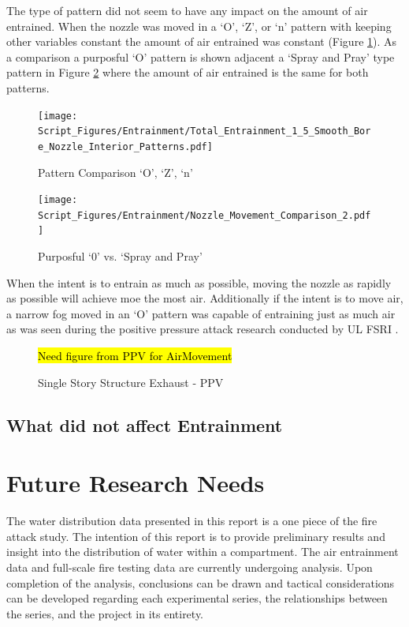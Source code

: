 \documentclass[12pt,oneside]{book}
\begin{document}
The type of pattern did not seem to have any impact on the amount of air entrained. When the nozzle was moved in a `O', `Z', or `n' pattern with keeping other variables constant the amount of air entrained was constant (Figure \ref{fig:Pattern_Compare_1}). As a comparison a purposful `O' pattern is shown adjacent a `Spray and Pray' type pattern in Figure \ref{fig:Pattern_Compare_2} where the amount of air entrained is the same for both patterns. 

\begin{figure}[!ht]
\centering
\texttt{[image: Script\_Figures/Entrainment/Total\_Entrainment\_1\_5\_Smooth\_Bore\_Nozzle\_Interior\_Patterns.pdf]}
\caption{Pattern Comparison `O', `Z', `n'}
\label{fig:Pattern_Compare_1}
\end{figure}

\begin{figure}[!ht]
\centering
\texttt{[image: Script\_Figures/Entrainment/Nozzle\_Movement\_Comparison\_2.pdf]}
\caption{Purposful `0' vs. `Spray and Pray'}
\label{fig:Pattern_Compare_2}
\end{figure}

When the intent is to entrain as much as possible, moving the nozzle as rapidly as possible will achieve moe the most air. Additionally if the intent is to move air, a narrow fog moved in an `O' pattern was capable of entraining just as much air as was seen during the positive pressure attack research conducted by UL FSRI \cite{Zevotek_Kerber:2016}. 

\begin{figure}
\centering
\hl{Need figure from PPV for AirMovement}
\caption{Single Story Structure Exhaust - PPV \cite{Zevotek_Kerber:2016}}
\label{fig:PPV}
\end{figure}


\section{What did not affect Entrainment}



\clearpage

\chapter{Future Research Needs}

The water distribution data presented in this report is a one piece of the fire attack study. The intention of this report is to provide preliminary results and insight into the distribution of water within a compartment. The air entrainment data and full-scale fire testing data are currently undergoing analysis. Upon completion of the analysis, conclusions can be drawn and tactical considerations can be developed regarding each experimental series, the relationships between the series, and the project in its entirety.  
\end{document}
